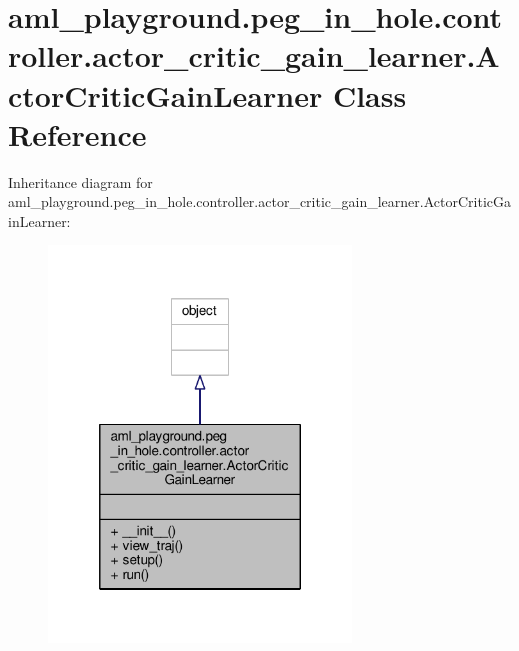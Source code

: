 \hypertarget{classaml__playground_1_1peg__in__hole_1_1controller_1_1actor__critic__gain__learner_1_1_actor_critic_gain_learner}{\section{aml\-\_\-playground.\-peg\-\_\-in\-\_\-hole.\-controller.\-actor\-\_\-critic\-\_\-gain\-\_\-learner.\-Actor\-Critic\-Gain\-Learner Class Reference}
\label{classaml__playground_1_1peg__in__hole_1_1controller_1_1actor__critic__gain__learner_1_1_actor_critic_gain_learner}
}


Inheritance diagram for aml\-\_\-playground.\-peg\-\_\-in\-\_\-hole.\-controller.\-actor\-\_\-critic\-\_\-gain\-\_\-learner.\-Actor\-Critic\-Gain\-Learner\-:\nopagebreak
\begin{figure}[H]
\begin{center}
\leavevmode
\includegraphics[width=228pt]{classaml__playground_1_1peg__in__hole_1_1controller_1_1actor__critic__gain__learner_1_1_actor_cr8188a45f10ee93c4fd80a5e9b2b3aed4}
\end{center}
\end{figure}



